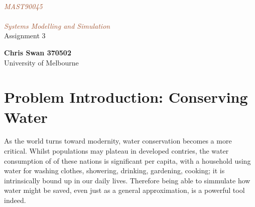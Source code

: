 \documentclass[a4paper, 11pt, oneside]{article}
\newcommand*{\plogo}{\fbox{$\mathcal{PL}$}} %
\begin{document}
\begin{center}  %
	
	
	\setlength{\unitlength}{0.6\textwidth} %
	
	{\color{LightGoldenrod}}\\[\baselineskip] %
	
	\textcolor{Sienna}{\textit{\Huge MAST90045\\ $\;$ \\Systems Modelling and Simulation}}\\[\baselineskip] %
	
	{\color{RosyBrown}\Large Assignment 3}\\ %
	
	{\color{LightGoldenrod}} %
	
	
	
	{\Large\textbf{Chris Swan 370502}}\\ %
	
	
	
	
	
	University of Melbourne %

\end{center}

\tableofcontents


\section{Problem Introduction: Conserving Water}

As the world turns toward modernity, water conservation becomes a more critical.  Whilst populations may plateau in developed contries, the water consumption of of these nations is significant per capita, with a household using water for washing clothes, showering, drinking, gardening, cooking; it is intrinsically bound up in our daily lives.  Therefore being able to simmulate how water might be saved, even just as a general approximation, is a powerful tool indeed.  \\
\end{document}
